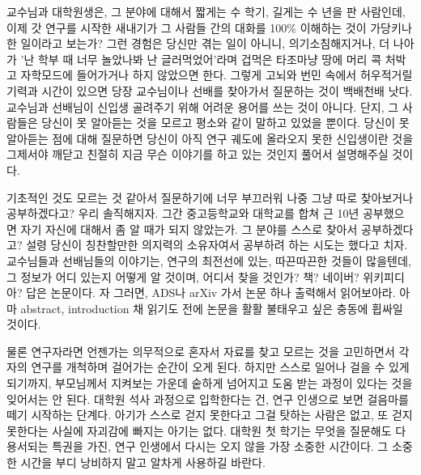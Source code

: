 교수님과 대학원생은, 그 분야에 대해서 짧게는 수 학기, 길게는 수 년을 판
사람인데, 이제 갓 연구를 시작한 새내기가 그 사람들 간의 대화를 100\% 이해하는
것이 가당키나 한 일이라고 보는가? 그런 경험은 당신만 겪는 일이 아니니,
의기소침해지거나, 더 나아가 '난 학부 때 너무 놀았나봐 난 글러먹었어'라며 겁먹은
타조마냥 땅에 머리 콕 처박고 자학모드에 들어가거나 하지 않았으면 한다. 그렇게
고뇌와 번민 속에서 허우적거릴 기력과 시간이 있으면 당장 교수님이나 선배를
찾아가서 질문하는 것이 백배천배 낫다. 교수님과 선배님이 신입생 골려주기 위해
어려운 용어를 쓰는 것이 아니다. 단지, 그 사람들은 당신이 못 알아듣는 것을 모르고
평소와 같이 말하고 있었을 뿐이다. 당신이 못 알아듣는 점에 대해 질문하면 당신이
아직 연구 궤도에 올라오지 못한 신입생이란 것을 그제서야 깨닫고 친절히 지금 무슨
이야기를 하고 있는 것인지 풀어서 설명해주실 것이다.  \vspace{\baselineskip}

기초적인 것도 모르는 것 같아서 질문하기에 너무 부끄러워 나중 그냥 따로 찾아보거나
공부하겠다고? 우리 솔직해지자. 그간 중고등학교와 대학교를 합쳐 근 10년 공부했으면
자기 자신에 대해서 좀 알 때가 되지 않았는가. 그 분야를 스스로 찾아서 공부하겠다고?
설령 당신이 칭찬할만한 의지력의 소유자여서 공부하려 하는 시도는 했다고
치자. 교수님들과 선배님들의 이야기는, 연구의 최전선에 있는, 따끈따끈한 것들이
많을텐데, 그 정보가 어디 있는지 어떻게 알 것이며, 어디서 찾을 것인가? 책?
네이버? 위키피디아? 답은 논문이다. 자 그러면, ADS나 arXiv 가서 논문 하나 출력해서
읽어보아라. 아마 abstract, introduction 채 읽기도 전에 논문을 활활 불태우고 싶은
충동에 휩싸일 것이다.  \vspace{\baselineskip}

물론 연구자라면 언젠가는 의무적으로 혼자서 자료를 찾고 모르는 것을 고민하면서
각자의 연구를 개척하며 걸어가는 순간이 오게 된다. 하지만 스스로 일어나 걸을 수
있게 되기까지, 부모님께서 지켜보는 가운데 숱하게 넘어지고 도움 받는 과정이 있다는
것을 잊어서는 안 된다. 대학원 석사 과정으로 입학한다는 건, 연구 인생으로 보면
걸음마를 떼기 시작하는 단계다. 아기가 스스로 걷지 못한다고 그걸 탓하는 사람은
없고, 또 걷지 못한다는 사실에 자괴감에 빠지는 아기는 없다. 대학원 첫 학기는
무엇을 질문해도 다 용서되는 특권을 가진, 연구 인생에서 다시는 오지 않을 가장
소중한 시간이다. 그 소중한 시간을 부디 낭비하지 말고 알차게 사용하길 바란다.
\vspace{\baselineskip}

